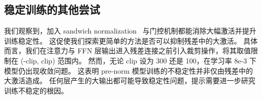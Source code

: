 \documentclass{article} %
\begin{document}
\subsection{稳定训练的其他尝试}

我们观察到，加入 sandwich normalization~\citep{ding2021cogview} 与门控机制都能消除大幅激活并提升训练稳定性。
这促使我们探索更简单的方法是否可以抑制残差中的大激活。
具体而言，我们在注意力与 FFN 层输出进入残差连接之前引入裁剪操作，将其取值限制在 (-clip, clip) 范围内。
然而，无论 clip 设为 300 还是 100，在学习率 8e-3 下模型仍出现收敛问题。
这表明 pre-norm 模型训练的不稳定性并非仅由残差中的大激活造成。
任何层产生的大输出都可能导致稳定性问题，提示需要进一步研究训练不稳定的根因。
\end{document}
